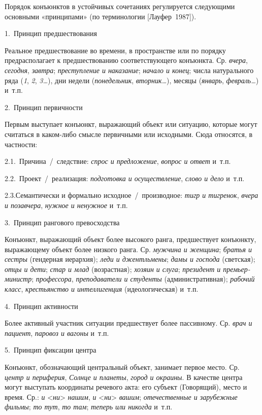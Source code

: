 Порядок конъюнктов в устойчивых сочетаниях регулируется следующими
основными «принципами» (по терминологии {[}Лауфер~1987{]}).

1.~Принцип предшествования

Реальное предшествование во времени, в пространстве или по порядку
предрасполагает к предшествованию соответствующего конъюнкта. Ср.
\textit{вчера}, \textit{сегодня}, \textit{завтра}; \textit{преступление и
  наказание}; \textit{начало и конец}; числа натурального ряда (\textit{1},
\textit{2}, \textit{3\ldots{}}), дни недели (\textit{понедельник},
\textit{вторник\ldots{}}), месяцы (\textit{январь}, \textit{февраль\ldots{}})
и~т.п.

2.~Принцип первичности

Первым выступает конъюнкт, выражающий объект или ситуацию, которые могут
считаться в каком-либо смысле первичными или исходными. Сюда относятся,
в частности:

2.1.~Причина~/~следствие: \textit{спрос и предложение}, \textit{вопрос и
  ответ} и~т.п.

2.2.~Проект~/~реализация: \textit{подготовка и осуществление}, \textit{слово
  и дело} и~т.п.

2.3.Семантически и формально исходное~/~производное: \textit{тигр и
  тигренок}, \textit{вчера и позавчера}, \textit{нужное и ненужное} и~т.п.

3.~Принцип рангового превосходства

Конъюнкт, выражающий объект более высокого ранга, предшествует
конъюнкту, выражающему объект более низкого ранга. Ср. \textit{мужчина и
  женщина}; \textit{братья и сестры} (гендерная иерархия); \textit{леди и
  джентльмены}; \textit{дамы и господа} (светская); \textit{отцы и дети};
\textit{стар и млад} (возрастная); \textit{хозяин и слуга}; \textit{президент
  и премьер-министр}; \textit{профессора}, \textit{преподаватели и студенты}
(административная); \textit{рабочий класс}, \textit{крестьянство и
  интеллигенция} (идеологическая) и~т.п.

4.~Принцип активности

Более активный участник ситуации предшествует более пассивному. Ср.
\textit{врач и пациент}, \textit{паровоз и вагоны} и~т.п.

5.~Принцип фиксации центра

Конъюнкт, обозначающий центральный объект, занимает первое место. Ср.
\textit{центр и периферия}, \textit{Солнце и планеты}, \textit{город и
  окраины}. В качестве центра могут выступать координаты речевого акта:
его субъект (Говорящий), место и время. Ср.: \textit{и}
\textless{}\textit{ни}\textgreater{} \textit{нашим}, \textit{и}
\textless{}\textit{ни}\textgreater{} \textit{вашим}; \textit{отечественные и
  зарубежные фильмы}; \textit{то тут}, \textit{то там}; \textit{теперь или
  никогда} и~т.п.

